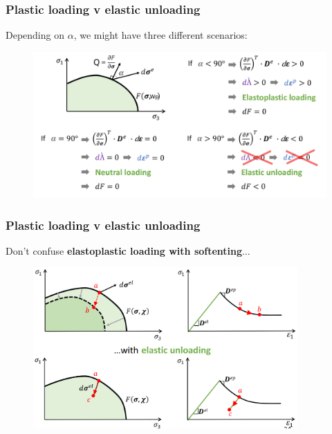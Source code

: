 \documentclass[handout]{beamer}
\begin{document}
\begin{frame}
\frametitle{Plastic loading v elastic unloading}
Depending on $\alpha$, we might have three different scenarios:
\begin{figure}
	\includegraphics[width=\textwidth]{figs/loading.png}
\end{figure}
\end{frame}

\begin{frame}
\frametitle{Plastic loading v elastic unloading}
Don't confuse \textbf{elastoplastic loading with softenting}...
\begin{figure}
	\includegraphics[width=0.9\textwidth]{figs/plastic-loading-elastic-unloading.png}
\end{figure}
\end{frame}
\end{document}
